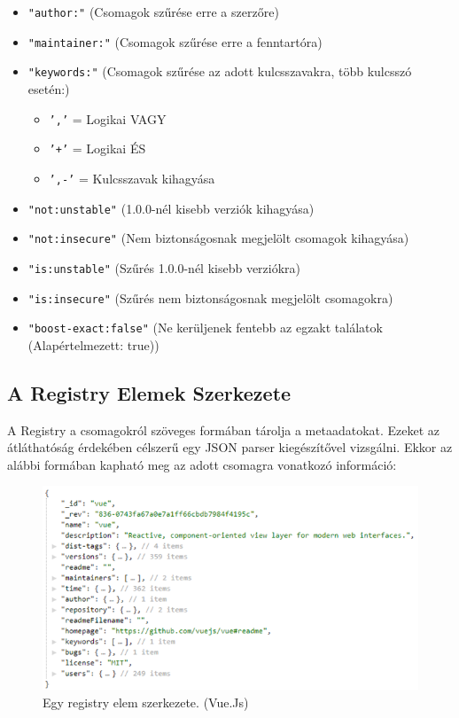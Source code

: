 \begin{itemize}
	\item \texttt{"author:"} (Csomagok szűrése erre a szerzőre)
	\item \texttt{"maintainer:"} (Csomagok szűrése erre a fenntartóra)
	\item \texttt{"keywords:"} (Csomagok szűrése az adott kulcsszavakra, több kulcsszó esetén:)
	\begin{itemize}
		\item \texttt{','} = Logikai VAGY
		\item \texttt{'+'} = Logikai ÉS
		\item \texttt{',-'} = Kulcsszavak kihagyása
	\end{itemize}
	\item \texttt{"not:unstable"} (1.0.0-nél kisebb verziók kihagyása)
	\item \texttt{"not:insecure"} (Nem biztonságosnak megjelölt csomagok kihagyása)
	\item \texttt{"is:unstable"} (Szűrés 1.0.0-nél kisebb verziókra)
	\item \texttt{"is:insecure"} (Szűrés nem biztonságosnak megjelölt csomagokra)
	\item \texttt{"boost-exact:false"} (Ne kerüljenek fentebb az egzakt találatok (Alapértelmezett: true))
\end{itemize}

\begin{flushright}
	\cite{npm-registry-api}
\end{flushright}

\subsection{A Registry Elemek Szerkezete}

A Registry a csomagokról szöveges formában tárolja a metaadatokat. Ezeket az átláthatóság érdekében célszerű egy JSON parser kiegészítővel vizsgálni. Ekkor az alábbi formában kapható meg az adott csomagra vonatkozó információ:

\begin{figure}[h]
	\centering
	\includegraphics[scale=0.75]{images/registry_vue.png}
	\caption{Egy registry elem szerkezete. (Vue.Js)}
	\label{fig:registry-package}
\end{figure}

